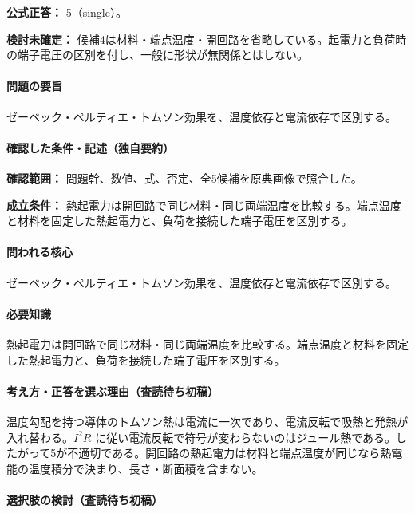 \textbf{公式正答：} 5（single）。

\par\textbf{検討未確定：} 候補4は材料・端点温度・開回路を省略している。起電力と負荷時の端子電圧の区別を付し、一般に形状が無関係とはしない。

\paragraph{問題の要旨} ゼーベック・ペルティエ・トムソン効果を、温度依存と電流依存で区別する。

\paragraph{確認した条件・記述（独自要約）}\mbox{}\par

\noindent\textbf{確認範囲：} 問題幹、数値、式、否定、全5候補を原典画像で照合した。\par

\noindent\textbf{成立条件：} 熱起電力は開回路で同じ材料・同じ両端温度を比較する。端点温度と材料を固定した熱起電力と、負荷を接続した端子電圧を区別する。\par

\paragraph{問われる核心} ゼーベック・ペルティエ・トムソン効果を、温度依存と電流依存で区別する。

\paragraph{必要知識} 熱起電力は開回路で同じ材料・同じ両端温度を比較する。端点温度と材料を固定した熱起電力と、負荷を接続した端子電圧を区別する。

\paragraph{考え方・正答を選ぶ理由（査読待ち初稿）} 温度勾配を持つ導体のトムソン熱は電流に一次であり、電流反転で吸熱と発熱が入れ替わる。\(I^2R\) に従い電流反転で符号が変わらないのはジュール熱である。したがって5が不適切である。開回路の熱起電力は材料と端点温度が同じなら熱電能の温度積分で決まり、長さ・断面積を含まない。

\paragraph{選択肢の検討（査読待ち初稿）}\mbox{}\par

